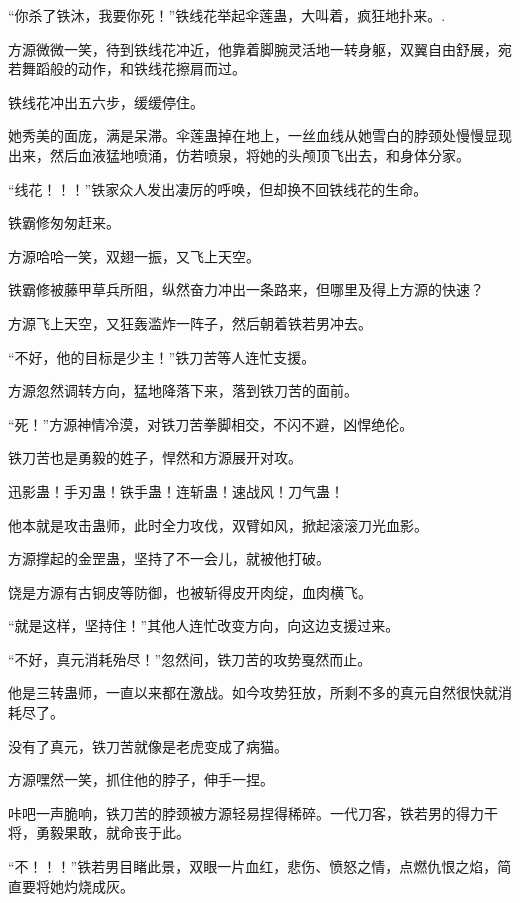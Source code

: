 
\begin{this_body}

“你杀了铁沐，我要你死！”铁线花举起伞莲蛊，大叫着，疯狂地扑来。.

方源微微一笑，待到铁线花冲近，他靠着脚腕灵活地一转身躯，双翼自由舒展，宛若舞蹈般的动作，和铁线花擦肩而过。

铁线花冲出五六步，缓缓停住。

她秀美的面庞，满是呆滞。伞莲蛊掉在地上，一丝血线从她雪白的脖颈处慢慢显现出来，然后血液猛地喷涌，仿若喷泉，将她的头颅顶飞出去，和身体分家。

“线花！！！”铁家众人发出凄厉的呼唤，但却换不回铁线花的生命。

铁霸修匆匆赶来。

方源哈哈一笑，双翅一振，又飞上天空。

铁霸修被藤甲草兵所阻，纵然奋力冲出一条路来，但哪里及得上方源的快速？

方源飞上天空，又狂轰滥炸一阵子，然后朝着铁若男冲去。

“不好，他的目标是少主！”铁刀苦等人连忙支援。

方源忽然调转方向，猛地降落下来，落到铁刀苦的面前。

“死！”方源神情冷漠，对铁刀苦拳脚相交，不闪不避，凶悍绝伦。

铁刀苦也是勇毅的姓子，悍然和方源展开对攻。

迅影蛊！手刃蛊！铁手蛊！连斩蛊！速战风！刀气蛊！

他本就是攻击蛊师，此时全力攻伐，双臂如风，掀起滚滚刀光血影。

方源撑起的金罡蛊，坚持了不一会儿，就被他打破。

饶是方源有古铜皮等防御，也被斩得皮开肉绽，血肉横飞。

“就是这样，坚持住！”其他人连忙改变方向，向这边支援过来。

“不好，真元消耗殆尽！”忽然间，铁刀苦的攻势戛然而止。

他是三转蛊师，一直以来都在激战。如今攻势狂放，所剩不多的真元自然很快就消耗尽了。

没有了真元，铁刀苦就像是老虎变成了病猫。

方源嘿然一笑，抓住他的脖子，伸手一捏。

咔吧一声脆响，铁刀苦的脖颈被方源轻易捏得稀碎。一代刀客，铁若男的得力干将，勇毅果敢，就命丧于此。

“不！！！”铁若男目睹此景，双眼一片血红，悲伤、愤怒之情，点燃仇恨之焰，简直要将她灼烧成灰。


\end{this_body}
